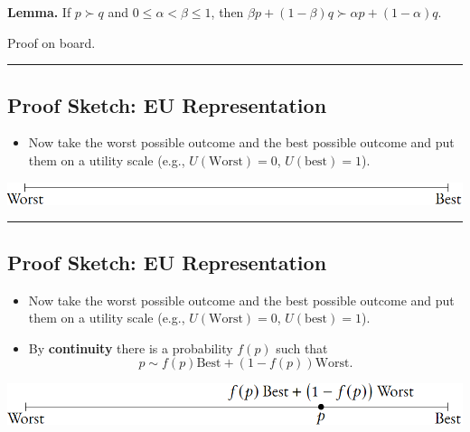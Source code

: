 \documentclass[
  letterpaper,
  DIV=11,
  numbers=noendperiod]{scrartcl}
\providecommand{\tightlist}{%
  \setlength{\itemsep}{0pt}\setlength{\parskip}{0pt}}\usepackage{longtable,booktabs,array}
\begin{document}
\textbf{Lemma.} If \(p\succ q\) and \(0\leq \alpha < \beta \leq 1\),
then \(\beta p + (1-\beta)q\succ \alpha p + (1-\alpha)q\).

Proof on board.

\begin{center}\rule{0.5\linewidth}{0.5pt}\end{center}

\subsection{Proof Sketch: EU
Representation}\label{proof-sketch-eu-representation-1}

\begin{itemize}
\tightlist
\item
  Now take the worst possible outcome and the best possible outcome and
  put them on a utility scale (e.g., \(U(\text{Worst}) = 0\),
  \(U(\text{best}) = 1\)).
\end{itemize}

\includegraphics[width=1\linewidth,height=\textheight,keepaspectratio]{figures/WorstBestEmpty.png}

\begin{center}\rule{0.5\linewidth}{0.5pt}\end{center}

\subsection{Proof Sketch: EU
Representation}\label{proof-sketch-eu-representation-2}

\begin{itemize}
\tightlist
\item
  Now take the worst possible outcome and the best possible outcome and
  put them on a utility scale (e.g., \(U(\text{Worst}) = 0\),
  \(U(\text{best}) = 1\)).
\item
  By \textbf{continuity} there is a probability \(f(p)\) such that \[ 
  p \sim f(p)\text{Best} + (1-f(p))\text{Worst}. 
  \]
\end{itemize}

\includegraphics[width=1\linewidth,height=\textheight,keepaspectratio]{figures/WorstBestP.png}
\end{document}
